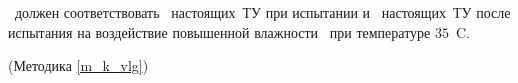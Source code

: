 \dut \ должен соответствовать \treb \ настоящих~ТУ при испытании и \trebafter \ настоящих~ТУ после испытания на воздействие повышенной влажности \kvlg \ при температуре $35$~\degree C.

\begin{flushright}
	(Методика \ref{m_k_vlg})
\end{flushright}

